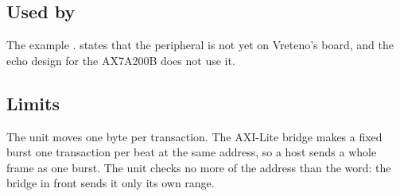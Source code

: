 \subsection*{Used by}

The example .  states that the
peripheral is not yet on Vreteno's board, and the echo design for the
AX7A200B does not use it.

\subsection*{Limits}

The unit moves one byte per transaction. The AXI-Lite bridge makes a
fixed burst one transaction per beat at the same address, so a host
sends a whole frame as one burst. The unit checks no more of the
address than the word: the bridge in front sends it only its own range.

